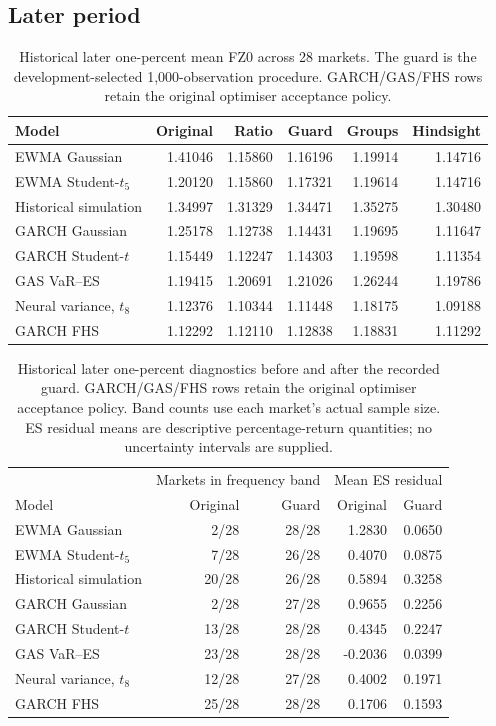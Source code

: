 \subsection{Later period}

\begin{table}[!htbp]
\centering\small
\caption[Historical later one-percent FZ0]{Historical later one-percent mean FZ0 across 28 markets. The guard is the development-selected 1,000-observation procedure. GARCH/GAS/FHS rows retain the original optimiser acceptance policy.}
\begin{tabular}{lrrrrr}
\toprule
Model & Original & Ratio & Guard & Groups & Hindsight \\
\midrule
EWMA Gaussian & 1.41046 & 1.15860 & 1.16196 & 1.19914 & 1.14716 \\
EWMA Student-$t_5$ & 1.20120 & 1.15860 & 1.17321 & 1.19614 & 1.14716 \\
Historical simulation & 1.34997 & 1.31329 & 1.34471 & 1.35275 & 1.30480 \\
GARCH Gaussian & 1.25178 & 1.12738 & 1.14431 & 1.19695 & 1.11647 \\
GARCH Student-$t$ & 1.15449 & 1.12247 & 1.14303 & 1.19598 & 1.11354 \\
GAS VaR--ES & 1.19415 & 1.20691 & 1.21026 & 1.26244 & 1.19786 \\
Neural variance, $t_8$ & 1.12376 & 1.10344 & 1.11448 & 1.18175 & 1.09188 \\
GARCH FHS & 1.12292 & 1.12110 & 1.12838 & 1.18831 & 1.11292 \\
\bottomrule
\end{tabular}
\end{table}
\begin{table}[!htbp]
\centering\small
\caption[Historical later one-percent diagnostics]{Historical later one-percent diagnostics before and after the recorded guard. GARCH/GAS/FHS rows retain the original optimiser acceptance policy. Band counts use each market's actual sample size. ES residual means are descriptive percentage-return quantities; no uncertainty intervals are supplied.}
\begin{tabular}{lrrrr}
\toprule
 & \multicolumn{2}{c}{Markets in frequency band} & \multicolumn{2}{c}{Mean ES residual} \\
Model & Original & Guard & Original & Guard \\
\midrule
EWMA Gaussian & 2/28 & 28/28 & 1.2830 & 0.0650 \\
EWMA Student-$t_5$ & 7/28 & 26/28 & 0.4070 & 0.0875 \\
Historical simulation & 20/28 & 26/28 & 0.5894 & 0.3258 \\
GARCH Gaussian & 2/28 & 27/28 & 0.9655 & 0.2256 \\
GARCH Student-$t$ & 13/28 & 28/28 & 0.4345 & 0.2247 \\
GAS VaR--ES & 23/28 & 28/28 & -0.2036 & 0.0399 \\
Neural variance, $t_8$ & 12/28 & 27/28 & 0.4002 & 0.1971 \\
GARCH FHS & 25/28 & 28/28 & 0.1706 & 0.1593 \\
\bottomrule
\end{tabular}
\end{table}
\FloatBarrier
